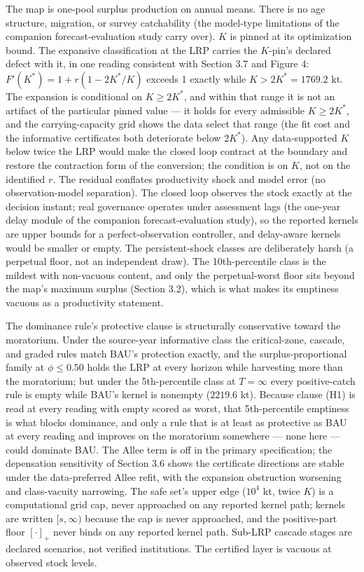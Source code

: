 \documentclass[11pt]{article}
\begin{document}
The map is one-pool surplus production on annual means. There is no age
structure, migration, or survey catchability (the model-type limitations
of the companion forecast-evaluation study carry over). \(K\) is pinned
at its optimization bound. The expansive classification at the LRP
carries the \(K\)-pin's declared defect with it, in one reading
consistent with Section 3.7 and Figure 4:
\(F'(K^*) = 1 + r(1 - 2K^*/K)\) exceeds 1 exactly while
\(K > 2K^* = 1769.2\) kt. The expansion is conditional on
\(K \ge 2K^*\), and within that range it is not an artifact of the
particular pinned value --- it holds for every admissible
\(K \ge 2K^*\), and the carrying-capacity grid shows the data select
that range (the fit cost and the informative certificates both
deteriorate below \(2K^*\)). Any data-supported \(K\) below twice the
LRP would make the closed loop contract at the boundary and restore the
contraction form of the conversion; the condition is on \(K\), not on
the identified \(r\). The residual conflates productivity shock and
model error (no observation-model separation). The closed loop observes
the stock exactly at the decision instant; real governance operates
under assessment lags (the one-year delay module of the companion
forecast-evaluation study), so the reported kernels are upper bounds for
a perfect-observation controller, and delay-aware kernels would be
smaller or empty. The persistent-shock classes are deliberately harsh (a
perpetual floor, not an independent draw). The 10th-percentile class is
the mildest with non-vacuous content, and only the perpetual-worst floor
sits beyond the map's maximum surplus (Section 3.2), which is what makes
its emptiness vacuous as a productivity statement.

The dominance rule's protective clause is structurally conservative
toward the moratorium. Under the source-year informative class the
critical-zone, cascade, and graded rules match BAU's protection exactly,
and the surplus-proportional family at \(\phi \le 0.50\) holds the LRP
at every horizon while harvesting more than the moratorium; but under
the 5th-percentile class at \(T=\infty\) every positive-catch rule is
empty while BAU's kernel is nonempty (\(2219.6\) kt). Because clause
(H1) is read at every reading with empty scored as worst, that
5th-percentile emptiness is what blocks dominance, and only a rule that
is at least as protective as BAU at every reading and improves on the
moratorium somewhere --- none here --- could dominate BAU. The Allee
term is off in the primary specification; the depensation sensitivity of
Section 3.6 shows the certificate directions are stable under the
data-preferred Allee refit, with the expansion obstruction worsening and
class-vacuity narrowing. The safe set's upper edge (\(10^4\) kt, twice
\(K\)) is a computational grid cap, never approached on any reported
kernel path; kernels are written \([s, \infty)\) because the cap is
never approached, and the positive-part floor \([\cdot]_+\) never binds
on any reported kernel path. Sub-LRP cascade stages are declared
scenarios, not verified institutions. The certified layer is vacuous at
observed stock levels.
\end{document}
